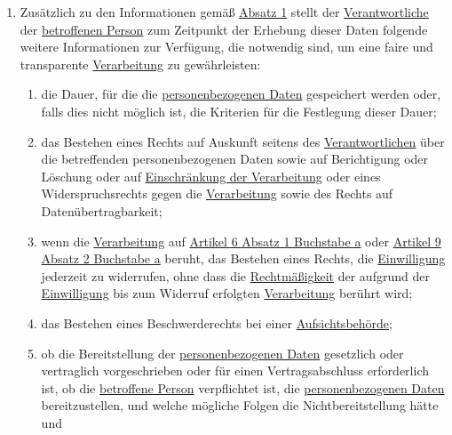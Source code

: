 \begin{enumerate}
\begin{enumerate}
  \end{enumerate}

  \item Zusätzlich zu den Informationen gemäß \hyperref[itm:13-1]{Absatz 1} stellt der \hyperref[itm:04-7]
   {Verantwortliche} der \hyperref[itm:04-1]{betroffenen Person} zum Zeitpunkt der Erhebung dieser Daten folgende
   weitere Informationen zur Verfügung, die notwendig sind, um eine faire und transparente \hyperref[itm:04-2]
   {Verarbeitung} zu gewährleisten:%
  \label{itm:13-2}

  \begin{enumerate}
  
    \item die Dauer, für die die \hyperref[itm:04-1]{personenbezogenen Daten} gespeichert werden oder, falls dies nicht
     möglich ist, die Kriterien für die Festlegung dieser Dauer;%
    \label{itm:13-2a}

    \item das Bestehen eines Rechts auf Auskunft seitens des \hyperref[itm:04-7]{Verantwortlichen} über die betreffenden
     personenbezogenen Daten sowie auf Berichtigung oder Löschung oder auf \hyperref[itm:04-3]{Einschränkung der
     Verarbeitung} oder eines Widerspruchsrechts gegen die \hyperref[itm:04-2]{Verarbeitung} sowie des Rechts auf
     Datenübertragbarkeit;%
    \label{itm:13-2b}

    \item wenn die \hyperref[itm:04-2]{Verarbeitung} auf \hyperref[itm:06-1a]{Artikel 6 Absatz 1 Buchstabe a}
     oder \hyperref[itm:09-2a]{Artikel 9 Absatz 2 Buchstabe a} beruht, das Bestehen eines Rechts, die \hyperref
     [itm:04-11]{Einwilligung} jederzeit zu widerrufen, ohne dass die \hyperref[itm:05-1a]{Rechtmäßigkeit} der aufgrund
     der \hyperref[itm:04-11]{Einwilligung} bis zum Widerruf erfolgten \hyperref[itm:04-2]{Verarbeitung} berührt wird;%
    \label{itm:13-2c}

    \item das Bestehen eines Beschwerderechts bei einer \hyperref[itm:04-21]{Aufsichtsbehörde};%
    \label{itm:13-2d}

    \item ob die Bereitstellung der \hyperref[itm:04-1]{personenbezogenen Daten} gesetzlich oder vertraglich
     vorgeschrieben oder für einen Vertragsabschluss erforderlich ist, ob die \hyperref[itm:04-1]{betroffene Person}
     verpflichtet ist, die \hyperref[itm:04-1]{personenbezogenen Daten} bereitzustellen, und welche mögliche Folgen die
     Nichtbereitstellung hätte und%
    \label{itm:13-2e}


\end{enumerate}
\end{enumerate}
